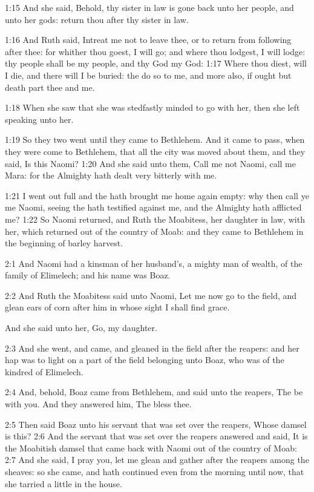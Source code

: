 1:15 And she said, Behold, thy sister in law is gone back unto her
people, and unto her gods: return thou after thy sister in law.

1:16 And Ruth said, Intreat me not to leave thee, or to return from
following after thee: for whither thou goest, I will go; and where
thou lodgest, I will lodge: thy people shall be my people, and thy God
my God: 1:17 Where thou diest, will I die, and there will I be buried:
the \LORD do so to me, and more also, if ought but death part thee and
me.

1:18 When she saw that she was stedfastly minded to go with her, then
she left speaking unto her.

1:19 So they two went until they came to Bethlehem. And it came to
pass, when they were come to Bethlehem, that all the city was moved
about them, and they said, Is this Naomi?  1:20 And she said unto
them, Call me not Naomi, call me Mara: for the Almighty hath dealt
very bitterly with me.

1:21 I went out full and the \LORD hath brought me home again empty:
why then call ye me Naomi, seeing the \LORD hath testified against me,
and the Almighty hath afflicted me?  1:22 So Naomi returned, and Ruth
the Moabitess, her daughter in law, with her, which returned out of
the country of Moab: and they came to Bethlehem in the beginning of
barley harvest.

2:1 And Naomi had a kinsman of her husband's, a mighty man of wealth,
of the family of Elimelech; and his name was Boaz.

2:2 And Ruth the Moabitess said unto Naomi, Let me now go to the
field, and glean ears of corn after him in whose sight I shall find
grace.

And she said unto her, Go, my daughter.

2:3 And she went, and came, and gleaned in the field after the
reapers: and her hap was to light on a part of the field belonging
unto Boaz, who was of the kindred of Elimelech.

2:4 And, behold, Boaz came from Bethlehem, and said unto the reapers,
The \LORD be with you. And they answered him, The \LORD bless thee.

2:5 Then said Boaz unto his servant that was set over the reapers,
Whose damsel is this?  2:6 And the servant that was set over the
reapers answered and said, It is the Moabitish damsel that came back
with Naomi out of the country of Moab: 2:7 And she said, I pray you,
let me glean and gather after the reapers among the sheaves: so she
came, and hath continued even from the morning until now, that she
tarried a little in the house.

